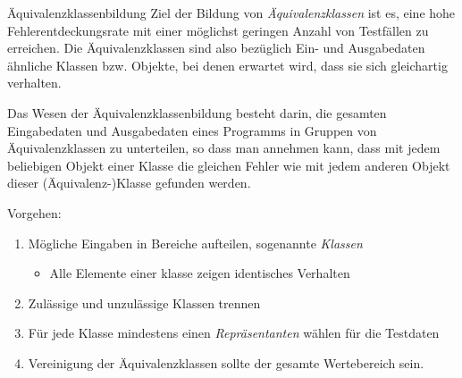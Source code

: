 \begin{defi}{Äquivalenzklassenbildung}
    Ziel der Bildung von \emph{Äquivalenzklassen} ist es, eine hohe Fehlerentdeckungsrate mit einer möglichst geringen Anzahl von Testfällen zu erreichen. Die Äquivalenzklassen sind also bezüglich Ein- und Ausgabedaten ähnliche Klassen bzw. Objekte, bei denen erwartet wird, dass sie sich gleichartig verhalten.

    Das Wesen der Äquivalenzklassenbildung besteht darin, die gesamten Eingabedaten und Ausgabedaten eines Programms in Gruppen von Äquivalenzklassen zu unterteilen, so dass man annehmen kann, dass mit jedem beliebigen Objekt einer Klasse die gleichen Fehler wie mit jedem anderen Objekt dieser (Äquivalenz-)Klasse gefunden werden.

    Vorgehen:
    \begin{enumerate}
        \item Mögliche Eingaben in Bereiche aufteilen, sogenannte \emph{Klassen}
              \begin{itemize}
                  \item Alle Elemente einer klasse zeigen identisches Verhalten
              \end{itemize}
        \item Zulässige und unzulässige Klassen trennen
        \item Für jede Klasse mindestens einen \emph{Repräsentanten} wählen für die Testdaten
        \item Vereinigung der Äquivalenzklassen sollte der gesamte Wertebereich sein.
    \end{enumerate}
\end{defi}

